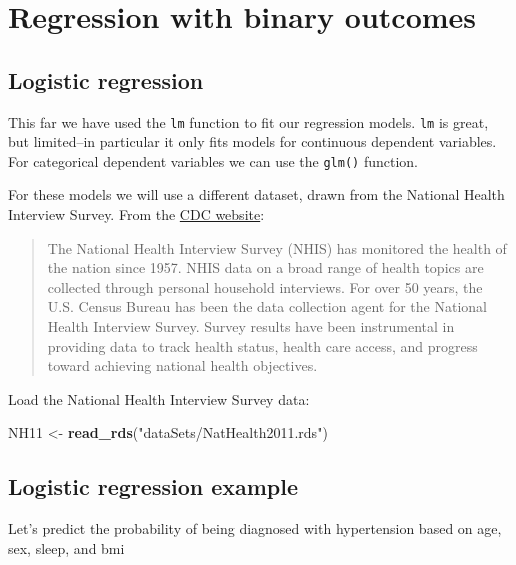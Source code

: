\documentclass[]{book}
\newenvironment{Shaded}{\begin{snugshade}}{\end{snugshade}}
\newcommand{\KeywordTok}[1]{\textcolor[rgb]{0.13,0.29,0.53}{\textbf{#1}}}
\newcommand{\StringTok}[1]{\textcolor[rgb]{0.31,0.60,0.02}{#1}}
\newcommand{\NormalTok}[1]{#1}
\begin{document}
\section{Regression with binary
outcomes}\label{regression-with-binary-outcomes}

\subsection{Logistic regression}\label{logistic-regression}

This far we have used the \texttt{lm} function to fit our regression
models. \texttt{lm} is great, but limited--in particular it only fits
models for continuous dependent variables. For categorical dependent
variables we can use the \texttt{glm()} function.

For these models we will use a different dataset, drawn from the
National Health Interview Survey. From the
\href{http://www.cdc.gov/nchs/nhis.htm}{CDC website}:

\begin{quote}
The National Health Interview Survey (NHIS) has monitored the health of
the nation since 1957. NHIS data on a broad range of health topics are
collected through personal household interviews. For over 50 years, the
U.S. Census Bureau has been the data collection agent for the National
Health Interview Survey. Survey results have been instrumental in
providing data to track health status, health care access, and progress
toward achieving national health objectives.
\end{quote}

Load the National Health Interview Survey data:

\begin{Shaded}
\begin{Highlighting}[]
\NormalTok{  NH11 <-}\StringTok{ }\KeywordTok{read_rds}\NormalTok{(}\StringTok{"dataSets/NatHealth2011.rds"}\NormalTok{)}
\end{Highlighting}
\end{Shaded}

\subsection{Logistic regression
example}\label{logistic-regression-example}

Let's predict the probability of being diagnosed with hypertension based
on age, sex, sleep, and bmi
\end{document}
